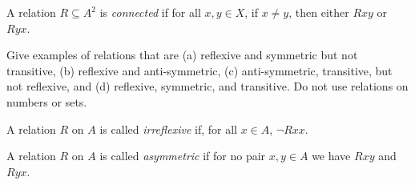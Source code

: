 \documentclass[../../../include/open-logic-section]{subfiles}
\begin{document}
\begin{defn}[Connectivity]
A relation $R \subseteq A^2$ is \emph{connected} if for all $x,y\in
X$, if $x \neq y$, then either $Rxy$ or~$Ryx$.
\end{defn}

\begin{prob}
Give examples of relations that are (a) reflexive and symmetric but
not transitive, (b) reflexive and anti-symmetric, (c) anti-symmetric,
transitive, but not reflexive, and (d) reflexive, symmetric, and
transitive.  Do not use relations on numbers or sets.
\end{prob} 
 
\begin{defn}[Irreflexivity]
A relation $R$ on $A$ is called \emph{irreflexive} if, for all $x \in
A$, $ \lnot Rxx$. 
\end{defn}

\begin{defn}[Asymmetry]
A relation $R$ on $A$ is called \emph{asymmetric} if for no pair $x,y\in
A$ we have $Rxy$ and $Ryx$. 
\end{defn}
\end{document}
